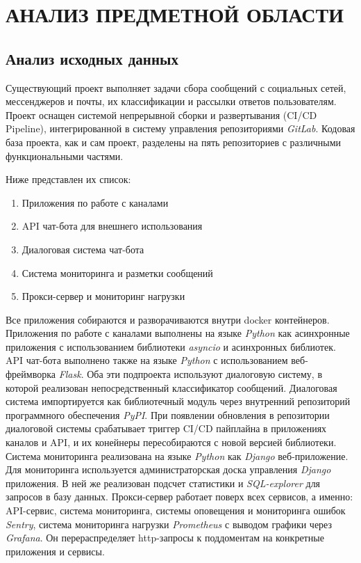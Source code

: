 \section{АНАЛИЗ ПРЕДМЕТНОЙ ОБЛАСТИ}
    \subsection{Анализ исходных данных}
    Существующий проект выполняет задачи сбора сообщений с социальных сетей, мессенджеров и почты,
    их классификации и рассылки ответов пользователям.
    Проект оснащен системой непрерывной сборки и развертывания (CI/CD Pipeline), интегрированной в
    систему управления репозиториями \textit{GitLab}.
    Кодовая база проекта, как и сам проект, разделены на пять репозиториев с различными
    функциональными частями.
    
    Ниже представлен их список:
    \begin{enumerate}
        \item Приложения по работе с каналами
        \item API чат-бота для внешнего использования
        \item Диалоговая система чат-бота
        \item Система мониторинга и разметки сообщений
        \item Прокси-сервер и мониторинг нагрузки
    \end{enumerate}
    
    Все приложения собираются и разворачиваются внутри docker контейнеров.
    Приложения по работе с каналами выполнены на языке \textit{Python} как асинхронные приложения
    с использованием библиотеки \textit{asyncio} и асинхронных библиотек.
    API чат-бота выполнено также на языке \textit{Python} с использованием веб-фреймворка \textit{Flask}.
    Оба эти подпроекта используют диалоговую систему, в которой реализован непосредственный
    классификатор сообщений.
    Диалоговая система импортируется как библиотечный модуль через внутренний репозиторий
    программного обеспечения \textit{PyPI}.
    При появлении обновления в репозитории диалоговой системы срабатывает триггер CI/CD пайплайна
    в приложениях каналов и API, и их конейнеры пересобираются с новой версией библиотеки.
    Система мониторинга реализована на языке \textit{Python} как \textit{Django} веб-приложение.
    Для мониторинга используется администраторская доска управления \textit{Django} приложения.
    В ней же реализован подсчет статистики и \textit{SQL-explorer} для запросов в базу данных.
    Прокси-сервер работает поверх всех сервисов, а именно: API-сервис, система мониторинга,
    системы оповещения и мониторинга ошибок \textit{Sentry}, система мониторинга нагрузки \textit{Prometheus}
    с выводом графики через \textit{Grafana}. Он перераспределяет http-запросы к поддоментам на конкретные
    приложения и сервисы.

